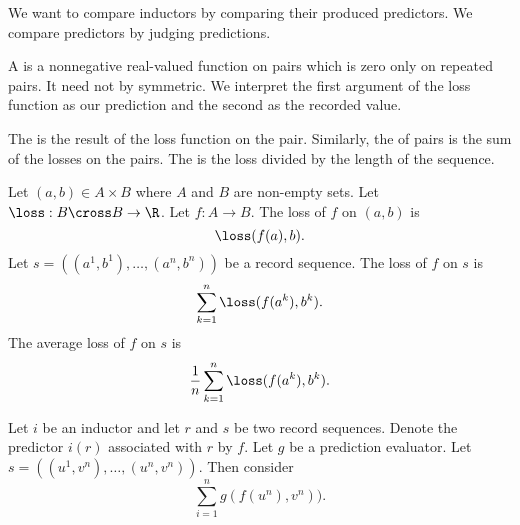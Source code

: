 
\sbasic

























\sstart
{}


We want to compare inductors
by comparing their produced predictors.
We compare predictors by judging predictions.


A  is a nonnegative
real-valued function on pairs
which is zero only on repeated pairs.
It need not by symmetric.
We interpret the first argument of the
loss function as our prediction
and the second as the recorded value.

The  is the
result of the loss function on the pair.
Similarly, the  of
pairs is the sum of the losses on the pairs.
The  is
the loss divided by the length of the sequence.


Let $(a, b) \in A \times B$
where $A$ and $B$ are non-empty sets.
Let $\loss: B \cross B \to \R$.
Let $f: A \to B$.
The loss of $f$ on $(a, b)$ is
\[
  \loss(f(a),b).
\]
Let $s = ((a^1, b^1), \dots, (a^n, b^n))$
be a record sequence.
The loss of $f$ on $s$ is
\[
  \sum_{k = 1}^{n} \loss(f(a^k), b^k).
\]
The average loss of $f$ on $s$ is
\[
  \frac{1}{n} \sum_{k = 1}^{n} \loss(f(a^k), b^k).
\]




Let $i$ be an inductor and let
$r$ and $s$ be two record sequences.
Denote the predictor $i(r)$ associated
with $r$ by $f$.
Let $g$ be a prediction evaluator.
Let $s = ((u^1, v^n), \dots, (u^n, v^n))$.
Then consider
\[
  \sum_{i = 1}^{n} g(f(u^n), v^n)).
\]


